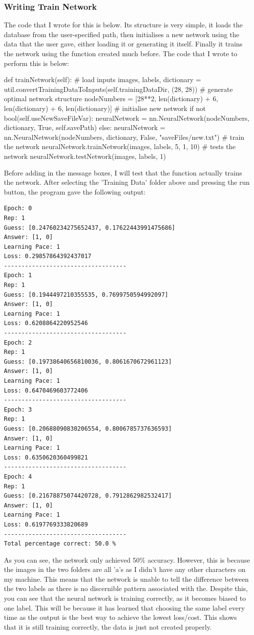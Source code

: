 \documentclass{report}
\begin{document}
\subsubsection{Writing Train Network}
The code that I wrote for this is below. Its structure is very simple, it loads the database from the user-specified path, then initialises a new network using the data that the user gave, either loading it or generating it itself. Finally it trains the network using the function created much before.
\newline
The code that I wrote to perform this is below:
\begin{python}
def trainNetwork(self):
    # load inputs
    images, labels, dictionary = util.convertTrainingDataToInputs(self.trainingDataDir, (28, 28))
    # generate optimal network structure
    nodeNumbers = [28**2, len(dictionary) + 6, len(dictionary) + 6, len(dictionary)]
    # initialise new network
    if not bool(self.useNewSaveFileVar):
        neuralNetwork = nn.NeuralNetwork(nodeNumbers, dictionary, True, self.savePath)
    else:
        neuralNetwork = nn.NeuralNetwork(nodeNumbers, dictionary, False, "saveFiles/new.txt")
    # train the network
    neuralNetwork.trainNetwork(images, labels, 5, 1, 10)
    # tests the network
    neuralNetwork.testNetwork(images, labels, 1)
\end{python}
Before adding in the message boxes, I will test that the function actually trains the network. After selecting the 'Training Data' folder above and pressing the run button, the program gave the following output:
\begin{verbatim}
Epoch: 0
Rep: 1
Guess: [0.24760234275652437, 0.17622443991475686]
Answer: [1, 0]
Learning Pace: 1
Loss: 0.29857864392437017
-----------------------------------
Epoch: 1
Rep: 1
Guess: [0.1944497210355535, 0.7699750594992097]
Answer: [1, 0]
Learning Pace: 1
Loss: 0.6208864220952546
-----------------------------------
Epoch: 2
Rep: 1
Guess: [0.19738640656810036, 0.8061670672961123]
Answer: [1, 0]
Learning Pace: 1
Loss: 0.6470469603772406
-----------------------------------
Epoch: 3
Rep: 1
Guess: [0.20688090830206554, 0.8006785737636593]
Answer: [1, 0]
Learning Pace: 1
Loss: 0.6350620360499821
-----------------------------------
Epoch: 4
Rep: 1
Guess: [0.21678875074420728, 0.7912862982532417]
Answer: [1, 0]
Learning Pace: 1
Loss: 0.6197769333820689
-----------------------------------
Total percentage correct: 50.0 %
\end{verbatim}
As you can see, the network only achieved 50\% accuracy. However, this is because the images in the two folders are all 'a's as I didn't have any other characters on my machine. This means that the network is unable to tell the difference between the two labels as there is no discernible pattern associated with the. Despite this, you can see that the neural network is training correctly, as it becomes biased to one label. This will be because it has learned that choosing the same label every time as the output is the best way to achieve the lowest loss/cost. This shows that it is still training correctly, the data is just not created properly.
\end{document}
